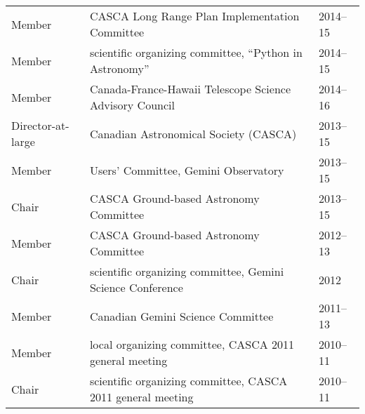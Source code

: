 \documentclass[12pt]{article}
\begin{document}
\begin{tabular}{lp{12cm}l}
Member& CASCA Long Range Plan Implementation Committee& 2014--15\\
Member& scientific organizing committee, ``Python in Astronomy'' & 2014--15\\
Member& Canada-France-Hawaii Telescope Science Advisory Council& 2014--16\\
Director-at-large& Canadian Astronomical Society (CASCA)& 2013--15\\
Member&  Users' Committee, Gemini Observatory& 2013--15\\
Chair& CASCA Ground-based Astronomy Committee& 2013--15\\
Member& CASCA Ground-based Astronomy Committee& 2012--13\\
Chair& scientific organizing committee, Gemini Science Conference& 2012\\
Member& Canadian Gemini Science Committee& 2011--13\\
Member& local organizing committee, CASCA 2011 general meeting&2010--11\\
Chair& scientific organizing committee, CASCA 2011 general meeting&2010--11\\
\end{tabular}
\end{document}
